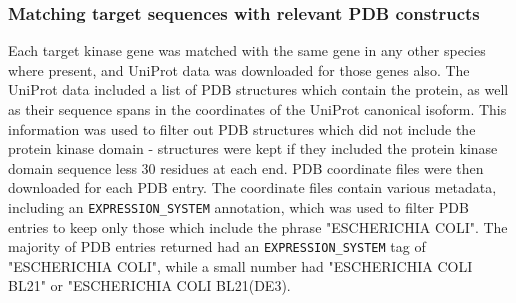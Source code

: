 \documentclass[aps,pre,twocolumn,nofootinbib,superscriptaddress,linenumbers]{revtex4-1}
\begin{document}
\subsubsection{Matching target sequences with relevant PDB constructs}

Each target kinase gene was matched with the same gene in any other species where present, and UniProt data was downloaded for those genes also.
The UniProt data included a list of PDB structures which contain the protein, as well as their sequence spans in the coordinates of the UniProt canonical isoform.
This information was used to filter out PDB structures which did not include the protein kinase domain - structures were kept if they included the protein kinase domain sequence less 30 residues at each end.
PDB coordinate files were then downloaded for each PDB entry.
The coordinate files contain various metadata, including an {\tt EXPRESSION\_SYSTEM} annotation, which was used to filter PDB entries to keep only those which include the phrase "ESCHERICHIA COLI".
The majority of PDB entries returned had an {\tt EXPRESSION\_SYSTEM} tag of "ESCHERICHIA COLI", while a small number had "ESCHERICHIA COLI BL21" or "ESCHERICHIA COLI BL21(DE3).
\end{document}
